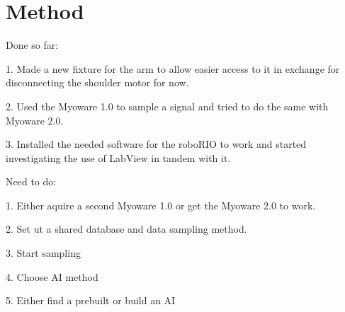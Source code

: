 \section{Method}
\label{section:method}





Done so far: 

1. Made a new fixture for the arm to allow easier access to it in exchange for disconnecting the shoulder motor for now.

2. Used the Myoware 1.0 to sample a signal and tried to do the same with Myoware 2.0.

3. Installed the needed software for the roboRIO to work and started investigating the use of LabView in tandem with it.

Need to do:

1. Either aquire a second Myoware 1.0 or get the Myoware 2.0 to work.

2. Set ut a shared database and data sampling method.

3. Start sampling

4. Choose AI method

5. Either find a prebuilt or build an AI